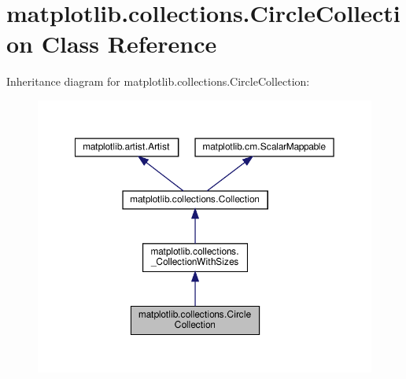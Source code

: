 \hypertarget{classmatplotlib_1_1collections_1_1CircleCollection}{}\section{matplotlib.\+collections.\+Circle\+Collection Class Reference}
\label{classmatplotlib_1_1collections_1_1CircleCollection}


Inheritance diagram for matplotlib.\+collections.\+Circle\+Collection\+:
\nopagebreak
\begin{figure}[H]
\begin{center}
\leavevmode
\includegraphics[width=350pt]{classmatplotlib_1_1collections_1_1CircleCollection__inherit__graph}
\end{center}
\end{figure}


